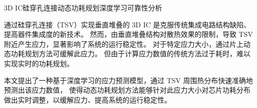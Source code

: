 
\begin{Cabstract}{3D IC}{硅穿孔连接}{动态功耗规划}{深度学习}{可靠性分析}

通过硅穿孔连接（TSV）实现垂直堆叠的 3D IC 是克服传统集成电路结构缺陷、提高器件集成度的新技术。
然而，由垂直堆叠结构对散热效果的限制，导致 TSV 附近产生应力，显著影响了系统的运行稳定性。
对于特定应力大小，通过片上动态功耗规划方法可缓解此应力。
但由于计算应力数值的传统方法过于耗时，难以实现实时的功耗规划。

本文提出了一种基于深度学习的应力预测模型，通过 TSV 周围热分布快速准确地预测出该应力数值，
使得动态功耗规划方法能够针对此应力大小对芯片功耗分布做出实时调整，以缓解应力、提高系统的运行稳定性。
\end{Cabstract}
